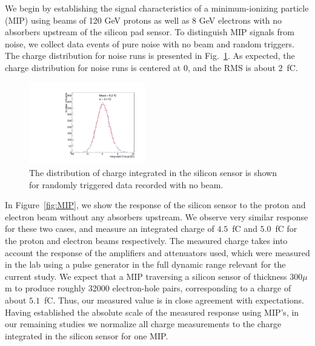 \documentclass[12pt]{article}
\begin{document}

We begin by establishing the signal characteristics of a minimum-ionizing
particle (MIP) using beams of 120 GeV protons as well as 8 GeV electrons with no
absorbers upstream of the silicon pad sensor. To distinguish MIP signals from
noise, we collect data events of pure noise with no beam and random triggers.
The charge distribution for noise runs is presented in
Fig.~\ref{fig:noise}. As expected, the charge distribution for noise
runs is centered at 0, and the RMS is about $2$~fC. 

\begin{figure}[htbp] 
\centering
\includegraphics[width=0.45\textwidth]{plots/NoiseNoBeam_charge.pdf} 
\caption{The distribution of charge integrated in the silicon sensor is shown for randomly triggered 
data recorded with no beam. } 
\label{fig:noise} 
\end{figure} 

In Figure~\ref{fig:MIP}, we show the response of the silicon sensor to
the proton and electron beam without any absorbers upstream. We observe very similar
response for these two cases, and measure an integrated charge of $4.5$~fC and $5.0$~fC
for the proton and electron beams respectively. The measured charge takes into account
the response of the amplifiers and attenuators used, which were measured 
in the lab using a pulse generator in the full dynamic range relevant for the current study.
We expect that a MIP traversing a silicon sensor of thickness 300$\mu$m to produce roughly 32000 
electron-hole pairs, corresponding to a charge of about $5.1$~fC. Thus, our measured value
is in close agreement with expectations. Having established the absolute scale of the measured 
response using MIP's, in our remaining studies we normalize all charge measurements to the 
charge integrated in the silicon sensor for one MIP. 
\end{document}
